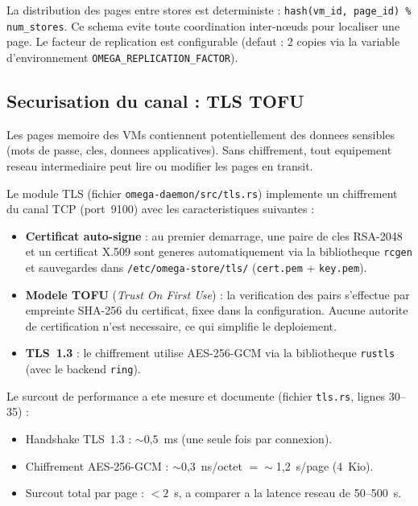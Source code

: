 La distribution des pages entre stores est deterministe : \texttt{hash(vm\_id, page\_id) \% num\_stores}. Ce schema evite toute coordination inter-n\oe{}uds pour localiser une page. Le facteur de replication est configurable (defaut : 2 copies via la variable d'environnement \texttt{OMEGA\_REPLICATION\_FACTOR}).

\subsection{Securisation du canal : TLS TOFU}
\label{subsec:tls-tofu}

Les pages memoire des VMs contiennent potentiellement des donnees sensibles (mots de passe, cles, donnees applicatives). Sans chiffrement, tout equipement reseau intermediaire peut lire ou modifier les pages en transit.

Le module TLS (fichier \texttt{omega-daemon/src/tls.rs}) implemente un chiffrement du canal TCP (port~9100) avec les caracteristiques suivantes :

\begin{itemize}
    \item \textbf{Certificat auto-signe} : au premier demarrage, une paire de cles RSA-2048 et un certificat X.509 sont generes automatiquement via la bibliotheque \texttt{rcgen} et sauvegardes dans \texttt{/etc/omega-store/tls/} (\texttt{cert.pem} + \texttt{key.pem}).
    \item \textbf{Modele TOFU} (\textit{Trust On First Use}) : la verification des pairs s'effectue par empreinte SHA-256 du certificat, fixee dans la configuration. Aucune autorite de certification n'est necessaire, ce qui simplifie le deploiement.
    \item \textbf{TLS~1.3} : le chiffrement utilise AES-256-GCM via la bibliotheque \texttt{rustls}~\cite{rustls_crate} (avec le backend \texttt{ring}).
\end{itemize}

Le surcout de performance a ete mesure et documente (fichier \texttt{tls.rs}, lignes 30--35) :

\begin{itemize}
    \item Handshake TLS~1.3 : $\sim$0,5~ms (une seule fois par connexion).
    \item Chiffrement AES-256-GCM : $\sim$0,3~ns/octet $= \sim$1,2~\textmu{}s/page (4~Kio).
    \item Surcout total par page : $< 2$~\textmu{}s, a comparer a la latence reseau de 50--500~\textmu{}s.
\end{itemize}

